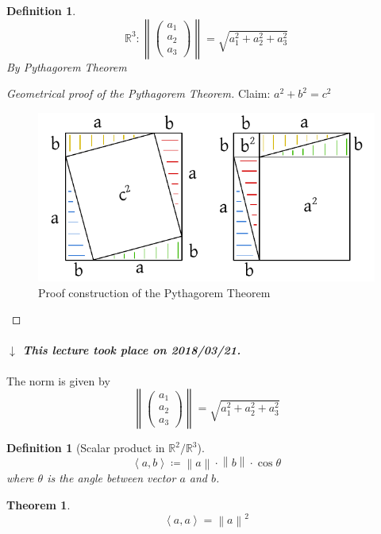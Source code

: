 \documentclass{article}
\newcounter{lecref}[section]
\numberwithin{lecref}{section}
\newtheorem{theorem}[lecref]{Theorem}
\newtheorem{definition}[lecref]{Definition}
\newcommand{\angel}[1]{\left\langle#1\right\rangle}
\newcommand{\norm}[1]{\left\|#1\right\|}
\newcommand{\dateref}[1]{%
  \begin{mdframed}[backgroundcolor=gray!10,innerbottommargin=0pt,innertopmargin=0pt]
    \paragraph{\textit{$\downarrow$ This lecture took place on #1.}}%
  \end{mdframed}%
}
\begin{document}
\begin{definition} %
  \[ \mathbb R^3: \norm{\begin{pmatrix} a_1 \\ a_2 \\ a_3 \end{pmatrix}} = \sqrt{a_1^2 + a_2^2 + a_3^2} \]
  By Pythagorem Theorem
\end{definition}

\begin{proof}[Geometrical proof of the Pythagorem Theorem]
  Claim: $a^2 + b^2 = c^2$

  \begin{figure}[!ht]
    \begin{center}
      \includegraphics{img/03_pytha.pdf}
      \caption{Proof construction of the Pythagorem Theorem}
      \label{fig:pytha}
    \end{center}
  \end{figure}
\end{proof}

\dateref{2018/03/21}

The norm is given by
\[ \norm{\begin{pmatrix} a_1 \\ a_2 \\ a_3 \end{pmatrix}} = \sqrt{a_1^2 + a_2^2 + a_3^2} \]

\begin{definition}[Scalar product in $\mathbb R^2/\mathbb R^3$]
  \[ \angel{a, b} \coloneqq \norm{a} \cdot \norm{b} \cdot \cos{\theta} \]
  where $\theta$ is the angle between vector $a$ and $b$.
\end{definition}

\begin{theorem}
  \[ \angel{a,a} = \norm{a}^2 \]
\end{theorem}
\end{document}
